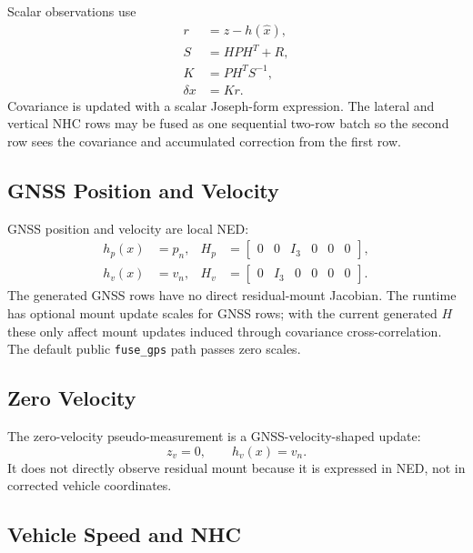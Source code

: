 \documentclass[11pt]{article}
\newcommand{\T}{^{T}}
\begin{document}
Scalar observations use
\begin{align}
  r &= z-h(\hat x),\\
  S &= HPH\T+R,\\
  K &= PH\T S^{-1},\\
  \delta x &= Kr .
\end{align}
Covariance is updated with a scalar Joseph-form expression. The lateral and
vertical NHC rows may be fused as one sequential two-row batch so the second
row sees the covariance and accumulated correction from the first row.

\subsection{GNSS Position and Velocity}

GNSS position and velocity are local NED:
\begin{align}
  h_p(x)&=p_n,& H_p&=\begin{bmatrix}0&0&I_3&0&0&0\end{bmatrix},\\
  h_v(x)&=v_n,& H_v&=\begin{bmatrix}0&I_3&0&0&0&0\end{bmatrix}.
\end{align}
The generated GNSS rows have no direct residual-mount Jacobian. The runtime has
optional mount update scales for GNSS rows; with the current generated \(H\)
these only affect mount updates induced through covariance cross-correlation.
The default public \texttt{fuse\_gps} path passes zero scales.

\subsection{Zero Velocity}

The zero-velocity pseudo-measurement is a GNSS-velocity-shaped update:
\begin{equation}
  z_v=0,\qquad h_v(x)=v_n .
\end{equation}
It does not directly observe residual mount because it is expressed in NED, not
in corrected vehicle coordinates.

\subsection{Vehicle Speed and NHC}
\end{document}
